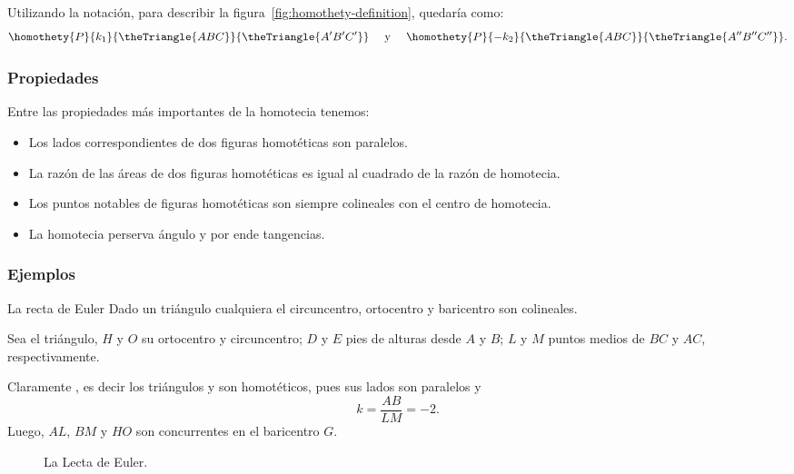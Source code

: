 Utilizando la notación, para describir la figura~\ref{fig:homothety-definition}, quedaría como:
\[
    \homothety{P}{k_1}{\theTriangle{ABC}}{\theTriangle{A' B' C'}} \quad \text{ y } \quad \homothety{P}{- k_2}{\theTriangle{ABC}}{\theTriangle{A'' B'' C''}}.
\]

\subsubsection{Propiedades}
Entre las propiedades más importantes de la homotecia tenemos:
\begin{itemize}
    \item Los lados correspondientes de dos figuras homotéticas son paralelos.
    \item La razón de las áreas de dos figuras homotéticas es igual al cuadrado de la razón de homotecia.
    \item Los puntos notables de figuras homotéticas son siempre colineales con el centro de homotecia.
    \item La homotecia perserva ángulo y por ende tangencias.
\end{itemize}


\subsubsection{Ejemplos}

\begin{section-example.tcb}{La recta de Euler}{}
    Dado un triángulo cualquiera el circuncentro, ortocentro y baricentro son colineales.
\end{section-example.tcb}

\begin{multicols}{2}

    \begin{solution}
        Sea  el triángulo, $H$ y $O$ su ortocentro y circuncentro; $D$ y $E$ pies de alturas desde $A$ y $B$; $L$ y $M$ puntos medios de $BC$ y $AC$, respectivamente.

        Claramente , es decir los triángulos  y  son homotéticos, pues sus lados son paralelos y
        \[
            k = \dfrac{AB}{LM} = -2.
        \]
        Luego, $AL$, $BM$ y $HO$ son concurrentes en el baricentro $G$.
    \end{solution}

    \begin{figure}[H]
        \centering
        
        \caption{La Lecta de Euler.}
    \end{figure}
\end{multicols}


